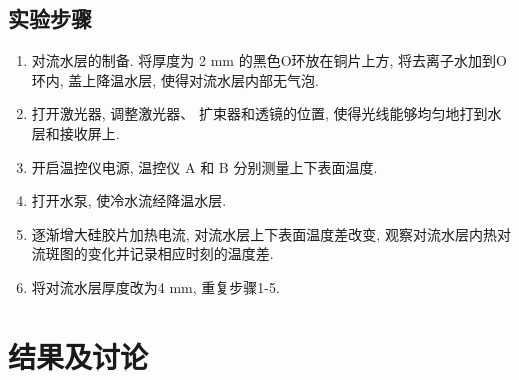 \documentclass[font=default]{mpltx}
\begin{document}
\subsection{实验步骤}
  \begin{enumerate}
    \item 对流水层的制备. 将厚度为 2 mm 的黑色O环放在铜片上方, 将去离子水加到O环内, 盖上降温水层, 使得对流水层内部无气泡.
    \item 打开激光器, 调整激光器、 扩束器和透镜的位置, 使得光线能够均匀地打到水层和接收屏上.
    \item 开启温控仪电源, 温控仪 A 和 B 分别测量上下表面温度.
    \item 打开水泵, 使冷水流经降温水层.
    \item 逐渐增大硅胶片加热电流, 对流水层上下表面温度差改变, 观察对流水层内热对流斑图的变化并记录相应时刻的温度差.
    \item 将对流水层厚度改为4 mm, 重复步骤1-5.
  \end{enumerate}

\section{结果及讨论}
\end{document}
